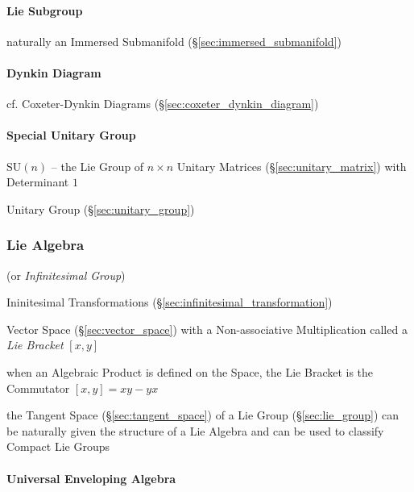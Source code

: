 \paragraph{Lie Subgroup}\label{sec:lie_subgroup}\hfill

naturally an Immersed Submanifold (\S\ref{sec:immersed_submanifold})



\paragraph{Dynkin Diagram}\label{sec:dynkin_diagram}\hfill

cf. Coxeter-Dynkin Diagrams (\S\ref{sec:coxeter_dynkin_diagram})



\paragraph{Special Unitary Group}\label{sec:special_unitary}\hfill

$\mathrm{SU}(n)$ -- the Lie Group of $n \times n$ Unitary Matrices
(\S\ref{sec:unitary_matrix}) with Determinant $1$

Unitary Group (\S\ref{sec:unitary_group})



\subsubsection{Lie Algebra}\label{sec:lie_algebra}

(or \emph{Infinitesimal Group})

Ininitesimal Transformations
(\S\ref{sec:infinitesimal_transformation})

Vector Space (\S\ref{sec:vector_space}) with a Non-associative
Multiplication called a \emph{Lie Bracket} $[x,y]$

when an Algebraic Product is defined on the Space, the Lie Bracket is
the Commutator $[x,y] = xy - yx$ %

the Tangent Space (\S\ref{sec:tangent_space}) of a Lie Group
(\S\ref{sec:lie_group}) can be naturally given the structure of a Lie Algebra
and can be used to classify Compact Lie Groups



\paragraph{Universal Enveloping Algebra}
\label{sec:universal_enveloping_algebra}\hfill

